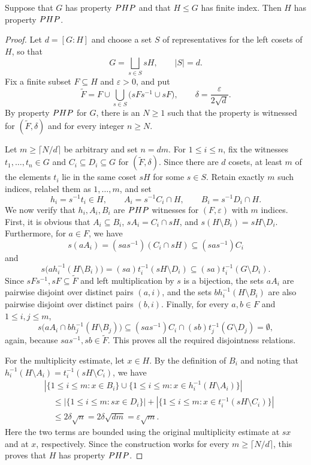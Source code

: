 \documentclass[10pt,a4paper]{amsart}
\begin{document}
\begin{prop}
    Suppose that $G$ has property ${\rm {PHP}}$ and that $H\leq G$ has finite index. Then $H$ has property ${\rm {PHP}}$.
\end{prop}

\begin{proof}
    Let $d=[G:H]$ and choose a set $S$ of representatives for the left cosets of $H$, so that
$$
  G=\bigsqcup_{s\in S}sH,
  \qquad |S|=d.
$$
Fix a finite subset $F\subseteq H$ and $\varepsilon>0$, and put
$$
  \widetilde F
  =F\cup\bigcup_{s\in S}\bigl(sFs^{-1}\cup sF\bigr),
  \qquad
  \delta=\frac{\varepsilon}{2\sqrt d}.
$$
By property ${\rm {PHP}}$ for $G$, there is an $N\geq1$ such that the property is witnessed for $(\widetilde F,\delta)$ and for every integer $n\geq N$.

Let $m\geq\lceil N/d\rceil$ be arbitrary and set $n=dm$. For $1\leq i\leq n$, fix the witnesses $t_1,\ldots,t_n\in G$ and $C_i\subseteq D_i\subseteq G$ for $(\widetilde F,\delta)$. Since there are $d$ cosets, at least $m$ of the elements $t_i$ lie in the same coset $sH$ for some $s\in S$. Retain exactly $m$ such indices, relabel them as $1,\ldots,m$, and set
$$
  h_i=s^{-1}t_i\in H, \qquad A_i=s^{-1}C_i\cap H, \qquad B_i=s^{-1}D_i\cap H.
$$
We now verify that $h_i,A_i,B_i$ are ${\rm {PHP}}$ witnesses for $(F,\varepsilon)$ with $m$ indices. First, it is obvious that $A_i\subseteq B_i$, $sA_i=C_i\cap sH$, and $s(H\setminus B_i)=sH\setminus D_i$. Furthermore, for $a\in F$, we have
$$
  s(aA_i)=(sas^{-1})(C_i\cap sH)\subseteq(sas^{-1})C_i
$$
and 
$$
s\bigl(ah_i^{-1}(H\setminus B_i)\bigr)=(sa)t_i^{-1}(sH\setminus D_i)\subseteq (sa)t_i^{-1}(G\setminus D_i).
$$
Since $sFs^{-1},sF\subseteq \widetilde F$ and left multiplication by $s$ is a bijection, the sets $aA_i$ are pairwise disjoint over distinct pairs $(a,i)$, and the sets $b h_i^{-1}(H\setminus B_i)$ are also pairwise disjoint over distinct pairs $(b,i)$. Finally, for every $a,b\in F$ and $1\leq i,j\leq m$,
$$
  s\bigl(aA_i\cap b h_j^{-1}(H\setminus B_j)\bigr)\subseteq (sas^{-1})C_i\cap(sb)t_j^{-1}(G\setminus D_j)=\emptyset,
$$
again, because $sas^{-1},sb\in\widetilde F$. This proves all the required disjointness relations.

For the multiplicity estimate, let $x\in H$. By the definition of $B_i$ and noting that $h_i^{-1}(H\setminus A_i)=t_i^{-1}(sH\setminus C_i)$, we have
\begin{align*}
  &\left|\{1\leq i\leq m:x\in B_i\}\cup\{1\leq i\leq m:x\in h_i^{-1}(H\setminus A_i)\}\right|    \\
  &\quad\leq |\{1\leq i\leq m:sx\in D_i\}|+|\{1\leq i\leq m:x\in t_i^{-1}(sH\setminus C_i)\}|   \\
  &\quad\leq 2\delta\sqrt n
    =2\delta\sqrt{dm}=\varepsilon\sqrt m.
\end{align*}
Here the two terms are bounded using the original multiplicity estimate at $sx$ and at $x$, respectively. Since the construction works for every $m\geq\lceil N/d\rceil$, this proves that $H$ has property ${\rm {PHP}}$.
\end{proof}
\end{document}
